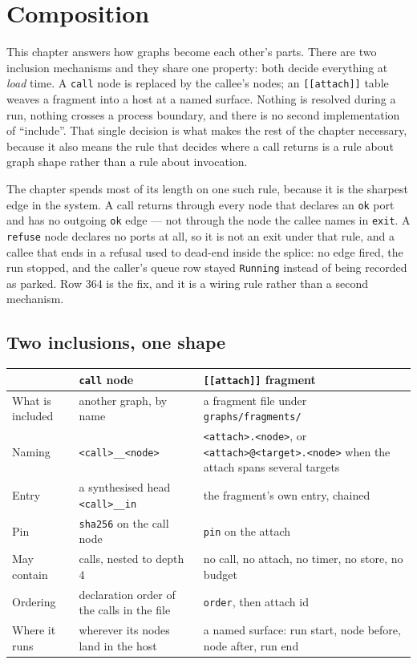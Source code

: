 \chapter{Composition}

\label{ch:composition}

This chapter answers how graphs become each other's parts. There are two inclusion mechanisms and
they share one property: both decide everything at \emph{load} time. A \texttt{call} node is
replaced by the callee's nodes; an \texttt{[[attach]]} table weaves a fragment into a host at a
named surface. Nothing is resolved during a run, nothing crosses a process boundary, and there is
no second implementation of \enquote{include}. That single decision is what makes the rest of the
chapter necessary, because it also means the rule that decides where a call returns is a rule about
graph shape rather than a rule about invocation.

The chapter spends most of its length on one such rule, because it is the sharpest edge in the
system. A call returns through every node that declares an \texttt{ok} port and has no outgoing
\texttt{ok} edge --- not through the node the callee names in \texttt{exit}. A \texttt{refuse} node
declares no ports at all, so it is not an exit under that rule, and a callee that ends in a refusal
used to dead-end inside the splice: no edge fired, the run stopped, and the caller's queue row
stayed \texttt{Running} instead of being recorded as parked. Row 364 is the fix, and it is a wiring
rule rather than a second mechanism.

\section{Two inclusions, one shape}

\begin{center}
\footnotesize
\begin{tabular}{@{}p{}p{}p{}@{}}
	\toprule
	 & \textbf{\texttt{call} node} & \textbf{\texttt{[[attach]]} fragment} \\
	\midrule
	What is included & another graph, by name & a fragment file under \texttt{graphs/fragments/} \\
	Naming & \texttt{<call>\_\_<node>} & \texttt{<attach>.<node>}, or \texttt{<attach>@<target>.<node>}
	when the attach spans several targets \\
	Entry & a synthesised head \texttt{<call>\_\_in} & the fragment's own entry, chained \\
	Pin & \texttt{sha256} on the call node & \texttt{pin} on the attach \\
	May contain & calls, nested to depth 4 & no call, no attach, no timer, no store, no budget \\
	Ordering & declaration order of the calls in the file & \texttt{order}, then attach id \\
	Where it runs & wherever its nodes land in the host & a named surface: run start, node before,
	node after, run end \\
	\bottomrule
\end{tabular}
\end{center}

